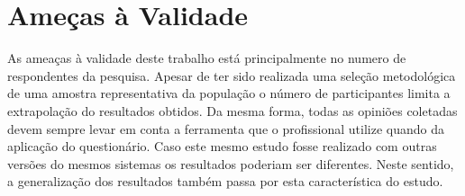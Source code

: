 



\section{Ameças à Validade}
As ameaças à validade deste trabalho está principalmente no numero de
respondentes da pesquisa. Apesar de ter sido realizada uma seleção metodológica
de uma amostra representativa da população o número de participantes limita a
extrapolação do resultados obtidos. Da mesma forma, todas as opiniões coletadas
devem sempre levar em conta a ferramenta que o profissional utilize quando da
aplicação do questionário. Caso este mesmo estudo fosse realizado com outras
versões do mesmos sistemas os resultados poderiam ser diferentes. Neste sentido,
a generalização dos resultados também passa por esta característica do estudo.


\label{sec:resumo_do_capitulo}
